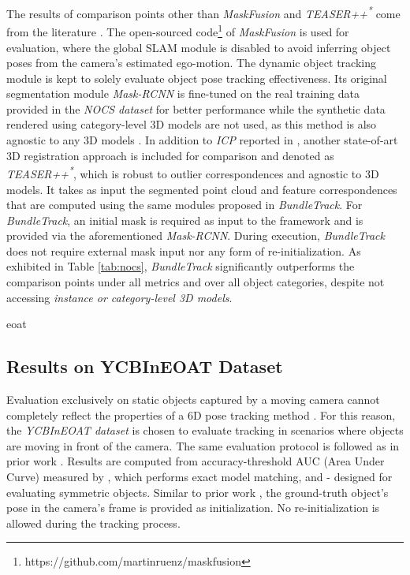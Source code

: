 \documentclass[letterpaper, 10 pt, conference]{ieeeconf}
\begin{document}
The results of comparison points other than \textit{MaskFusion} and \textit{TEASER++\textsuperscript{*}} come from the literature \cite{wang20196-pack}.  The open-sourced code\footnote{https://github.com/martinruenz/maskfusion} of \textit{MaskFusion} is used for evaluation, where the global SLAM module is disabled to avoid inferring object poses from the camera's estimated ego-motion. The dynamic object tracking module is kept to solely evaluate object pose tracking effectiveness. Its original segmentation module \textit{Mask-RCNN} \cite{he2017mask} is fine-tuned on the real training data provided in the \textit{NOCS dataset} for better performance while the synthetic data rendered using category-level 3D models are not used, as this method is also agnostic to any 3D models \cite{runz2018maskfusion}. In addition to \textit{ICP} reported in \cite{wang20196-pack},  another state-of-art 3D registration approach \cite{Yang20troteaser} is included for comparison and denoted as \textit{TEASER++\textsuperscript{*}}, which is robust to outlier correspondences and agnostic to 3D models. It takes as input the segmented point cloud and feature correspondences that are computed using the same modules proposed in \textit{BundleTrack}. 
For \textit{BundleTrack}, an initial mask  is required as input to the framework and is provided via the aforementioned \textit{Mask-RCNN}. During execution, \textit{BundleTrack} does not require external mask input nor any form of re-initialization. As exhibited in Table \ref{tab:nocs}, \textit{BundleTrack} significantly outperforms the comparison points under all metrics and over all object categories, despite not accessing \textit{instance or category-level 3D models}.



{eoat}





\subsection{Results on YCBInEOAT Dataset}
\label{sec:eval_eoat}



Evaluation exclusively on static objects captured by a moving camera cannot completely reflect the properties of a 6D pose tracking method \cite{wense3tracknet}. For this reason, the \textit{YCBInEOAT dataset} is chosen to evaluate tracking in scenarios where objects are moving in front of the camera.  The same evaluation protocol is followed as in prior work \cite{wense3tracknet}. Results are computed from accuracy-threshold AUC (Area Under Curve) measured by , which performs exact model matching, and - \cite{xiang2017posecnn} designed for evaluating symmetric objects. Similar to prior work \cite{wense3tracknet}, the ground-truth object's pose in the camera's frame is provided as initialization. No re-initialization is allowed during the tracking process. 
\end{document}
